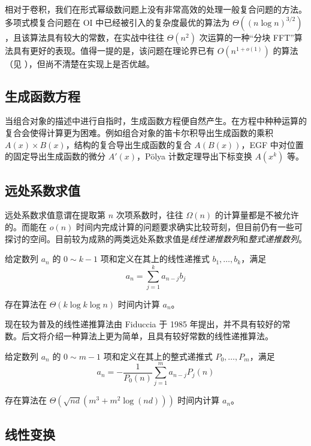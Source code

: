 相对于卷积，我们在形式幂级数问题上没有非常高效的处理一般复合问题的方法。多项式模复合问题在 OI 中已经被引入的复杂度最优的算法为 $\Theta((n\log n)^{3/2})$，且该算法具有较大的常数，在实战中往往 $\Theta(n^2)$ 次运算的一种“分块 FFT”算法具有更好的表现。值得一提的是，该问题在理论界已有 $O(n^{1+o(1)})$ 的算法（见 \cite{polyfact}），但尚不清楚在实现上是否优越。

\subsection{生成函数方程}

当组合对象的描述中进行自指时，生成函数方程便自然产生。在方程中种种运算的复合会使得计算更为困难。例如组合对象的笛卡尔积导出生成函数的乘积 $A(x)\times B(x)$，结构的复合导出生成函数的复合 $A(B(x))$，EGF 中对位置的固定导出生成函数的微分 $A'(x)$，P\"olya 计数定理导出下标变换 $A(x^k)$ 等。

\subsection{远处系数求值}

远处系数求值意谓在提取第 $n$ 次项系数时，往往 $\Omega(n)$ 的计算量都是不被允许的。而能在 $o(n)$ 时间内完成计算的问题要求确实比较苛刻，但目前仍有一些可探讨的空间。目前较为成熟的两类远处系数求值是\emph{线性递推数列}和\emph{整式递推数列}。

\begin{theorem}给定数列 $a_n$ 的 $0\sim k-1$ 项和定义在其上的线性递推式 $b_1,\dots, b_k$，满足
$$ a_n = \sum_{j=1}^k a_{n-j} b_j $$

存在算法在 $\Theta(k\log k\log n)$ 时间内计算 $a_n$。
\end{theorem}

现在较为普及的线性递推算法由 Fiduccia 于 1985 年提出，并不具有较好的常数。后文将介绍一种算法上更为简单，且具有较好常数的线性递推算法。

\begin{theorem}给定数列 $a_n$ 的 $0\sim m-1$ 项和定义在其上的整式递推式 $P_0,\dots,P_m$，满足
$$ a_n = -\frac1{P_0(n)}\sum_{j=1}^m a_{n-j}P_j(n) $$

存在算法在 $\Theta \left(\sqrt{nd}\left(m^3+m^2\log(nd)\right)\right)$ 时间内计算 $a_n$。
\end{theorem}

\subsection{线性变换}

